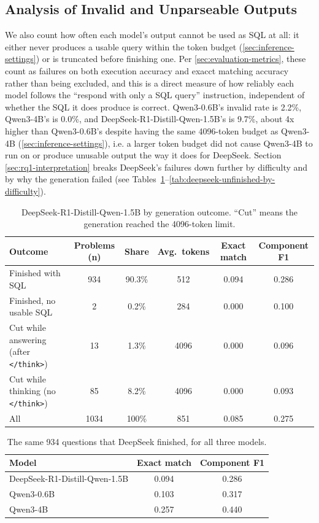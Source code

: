 \subsection{Analysis of Invalid and Unparseable Outputs}
\label{sec:invalid-outputs}

We also count how often each model's output cannot be used as SQL at all: it either never produces a usable query within the token budget (\ref{sec:inference-settings}) or is truncated before finishing one. Per \ref{sec:evaluation-metrics}, these count as failures on both execution accuracy and exacct matching accuracy rather than being excluded, and this is a direct measure of how reliably each model follows the ``respond with only a SQL query'' instruction, independent of whether the SQL it does produce is correct. Qwen3-0.6B's invalid rate is 2.2\%, Qwen3-4B's is 0.0\%, and DeepSeek-R1-Distill-Qwen-1.5B's is 9.7\%, about 4x higher than Qwen3-0.6B's despite having the same 4096-token budget as Qwen3-4B (\ref{sec:inference-settings}), i.e. a larger token budget did not cause Qwen3-4B to run on or produce unusable output the way it does for DeepSeek. Section \ref{sec:rq1-interpretation} breaks DeepSeek's failures down further by difficulty and by why the generation failed (see Tables~\ref{tab:deepseek-outcome}--\ref{tab:deepseek-unfinished-by-difficulty}).


\begin{table}[H]
\centering
\footnotesize
\caption{DeepSeek-R1-Distill-Qwen-1.5B by generation outcome. ``Cut'' means the generation reached the 4096-token limit.}
\label{tab:deepseek-outcome}
\begin{tabular}{lccccc}
\toprule
Outcome & Problems (n) & Share & Avg.\ tokens & Exact match & Component F1 \\
\midrule
Finished with SQL & 934 & 90.3\% & 512 & 0.094 & 0.286 \\
Finished, no usable SQL & 2 & 0.2\% & 284 & 0.000 & 0.100 \\
Cut while answering (after \texttt{</think>}) & 13 & 1.3\% & 4096 & 0.000 & 0.096 \\
Cut while thinking (no \texttt{</think>}) & 85 & 8.2\% & 4096 & 0.000 & 0.093 \\
All & 1034 & 100\% & 851 & 0.085 & 0.275 \\
\bottomrule
\end{tabular}
\end{table}

\begin{table}[H]
\centering
\footnotesize
\caption{The same 934 questions that DeepSeek finished, for all three models.}
\label{tab:deepseek-finished-934}
\begin{tabular}{lcc}
\toprule
Model & Exact match & Component F1 \\
\midrule
DeepSeek-R1-Distill-Qwen-1.5B & 0.094 & 0.286 \\
Qwen3-0.6B & 0.103 & 0.317 \\
Qwen3-4B & 0.257 & 0.440 \\
\bottomrule
\end{tabular}
\end{table}

